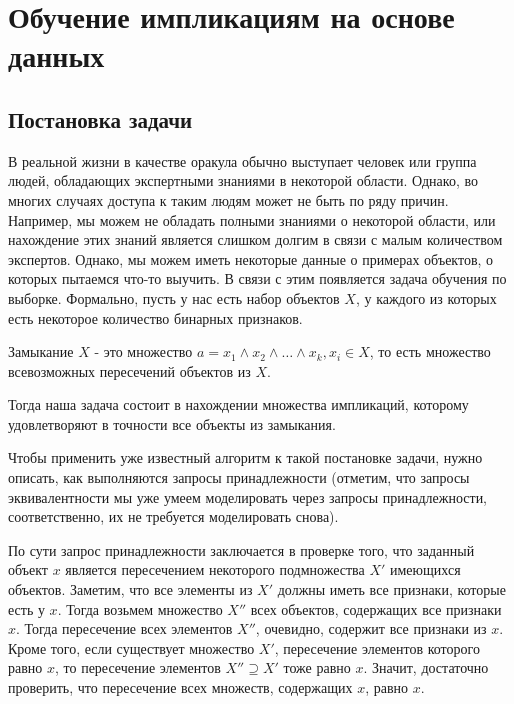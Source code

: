 \section{Обучение импликациям на основе данных}
\subsection{Постановка задачи}
В реальной жизни в качестве оракула обычно выступает человек или группа людей, обладающих экспертными знаниями в некоторой области. Однако, во многих случаях доступа к таким людям может не быть по ряду причин. Например, мы можем не обладать полными знаниями о некоторой области, или нахождение этих знаний является слишком долгим в связи с малым количеством экспертов. Однако, мы можем иметь некоторые данные о примерах объектов, о которых пытаемся что-то выучить. В связи с этим появляется задача обучения по выборке. Формально, пусть у нас есть набор объектов $X$, у каждого из которых есть некоторое количество бинарных признаков.

\begin{definition}
Замыкание $X$ - это множество $a = x_1 \land x_2 \land \dots \land x_k, x_i \in X$, то есть множество всевозможных пересечений объектов из $X$.
\end{definition}

Тогда наша задача состоит в нахождении множества импликаций, которому удовлетворяют в точности все объекты из замыкания.

Чтобы применить уже известный алгоритм к такой постановке задачи, нужно описать, как выполняются запросы принадлежности (отметим, что запросы эквивалентности мы уже умеем моделировать через запросы принадлежности, соответственно, их не требуется моделировать снова).

По сути запрос принадлежности заключается в проверке того, что заданный объект $x$ является пересечением некоторого подмножества $X'$ имеющихся объектов. Заметим, что все элементы из $X'$ должны иметь все признаки, которые есть у $x$. Тогда возьмем множество $X''$ всех объектов, содержащих все признаки $x$. Тогда пересечение всех элементов $X''$, очевидно, содержит все признаки из $x$. Кроме того, если существует множество $X'$, пересечение элементов которого равно $x$, то пересечение элементов $X'' \supseteq X'$ тоже равно $x$. Значит, достаточно проверить, что пересечение всех множеств, содержащих $x$, равно $x$.

